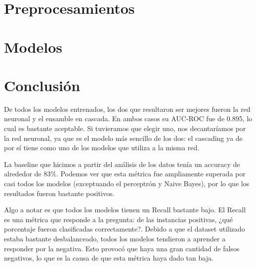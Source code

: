 \documentclass[12pt]{article}
\numberwithin{equation}{section}
\numberwithin{figure}{section}
\numberwithin{table}{section}
\begin{document}
	\tableofcontents
	\newpage
	
	
	\section{Preprocesamientos}
	
	\begingroup
	\fontsize{11pt}{12pt}\selectfont
	
	
	\endgroup

	\pagebreak

	\section{Modelos}

	\begingroup
	\fontsize{11pt}{12pt}\selectfont
	
	
	\endgroup
	
	
	\restoregeometry
	
	\pagebreak

	\section{Conclusión}
	De todos los modelos entrenados, los dos que resultaron ser mejores 
	fueron la red neuronal y el ensamble en cascada. En ambos casos su
	AUC-ROC fue de 0.895, lo cual es bastante aceptable. Si tuvieramos que
	elegir uno, nos decantaríamos por la red neuronal, ya que es el modelo
	más sencillo de los dos: el cascading ya de por sí tiene como uno de los
	modelos que utiliza a la misma red.

	La baseline que hicimos a partir del análisis de los datos tenía un
	accuracy de alrededor de $83\%$. Podemos ver que esta métrica fue
	ampliamente superada por casi todos los modelos (exceptuando el
	perceptrón y Naive Bayes), por lo que los resultados fueron bastante
	positivos.

	Algo a notar es que todos los modelos tienen un Recall bastante bajo.
	El Recall es una métrica que responde a la pregunta: de las instancias
	positivas, ¿qué porcentaje fueron clasificadas correctamente?. Debido
	a que el dataset utilizado estaba bastante desbalanceado, todos los modelos
	tendieron a aprender a responder por la negativa. Esto provocó que haya
	una gran cantidad de falsos negativos, lo que es la causa de que esta métrica
	haya dado tan baja.
\end{document}
